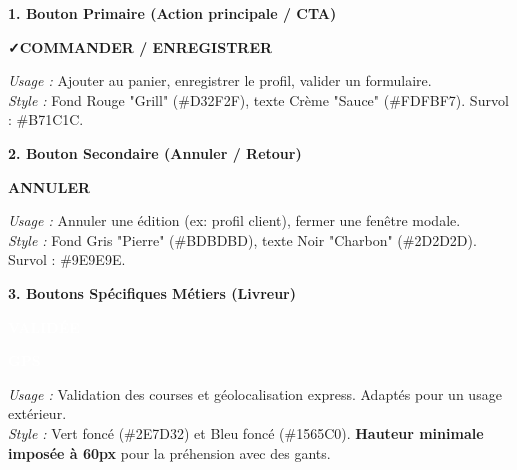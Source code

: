 \documentclass[12pt,a4paper]{article}
\begin{document}
\vspace{0.3cm}
\textbf{1. Bouton Primaire (Action principale / CTA)}
\begin{center}
    \begin{tcolorbox}[hbox, colback=GrillRed, colframe=DarkRed, arc=4px, boxrule=1pt, left=15pt, right=15pt, top=5pt, bottom=5pt, drop fuzzy shadow]
        \textcolor{SauceCream}{\textbf{\faCheck \quad COMMANDER / ENREGISTRER}}
    \end{tcolorbox}
\end{center}
\textit{Usage :} Ajouter au panier, enregistrer le profil, valider un formulaire. \\
\textit{Style :} Fond Rouge "Grill" (\#D32F2F), texte Crème "Sauce" (\#FDFBF7). Survol : \#B71C1C.

\vspace{0.3cm}
\textbf{2. Bouton Secondaire (Annuler / Retour)}
\begin{center}
    \begin{tcolorbox}[hbox, colback=StoneGray, colframe=HoverGray, arc=4px, boxrule=1pt, left=15pt, right=15pt, top=5pt, bottom=5pt, drop fuzzy shadow]
        \textcolor{CoalBlack}{\textbf{\faTimes \quad ANNULER}}
    \end{tcolorbox}
\end{center}
\textit{Usage :} Annuler une édition (ex: profil client), fermer une fenêtre modale. \\
\textit{Style :} Fond Gris "Pierre" (\#BDBDBD), texte Noir "Charbon" (\#2D2D2D). Survol : \#9E9E9E.

\vspace{0.3cm}
\textbf{3. Boutons Spécifiques Métiers (Livreur)}
\begin{center}
    \begin{tcolorbox}[hbox, colback=SuccessGreen, colframe=SuccessGreen!80!black, arc=4px, boxrule=1pt, left=15pt, right=15pt, top=5pt, bottom=5pt, drop fuzzy shadow]
        \textcolor{white}{\textbf{\faCheckCircle \quad VALIDÉE}}
    \end{tcolorbox}
    \hspace{10pt}
    \begin{tcolorbox}[hbox, colback=GpsBlue, colframe=GpsBlue!80!black, arc=4px, boxrule=1pt, left=15pt, right=15pt, top=5pt, bottom=5pt, drop fuzzy shadow]
        \textcolor{white}{\textbf{\faMapMarkerAlt \quad GPS}}
    \end{tcolorbox}
\end{center}
\textit{Usage :} Validation des courses et géolocalisation express. Adaptés pour un usage extérieur. \\
\textit{Style :} Vert foncé (\#2E7D32) et Bleu foncé (\#1565C0). \textbf{Hauteur minimale imposée à 60px} pour la préhension avec des gants.
\end{document}
